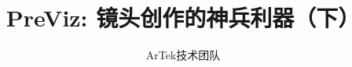 \documentclass[paper=a4,fontsize=11pt]{scrartcl}
\begin{document}
 
\begin{CJK*}{UTF8}{gbsn}
	\title{PreViz: 镜头创作的神兵利器（下）}
	\author{ArTek技术团队} 
	\maketitle 
	
	
%	
%	


\end{CJK*} 
\end{document}
